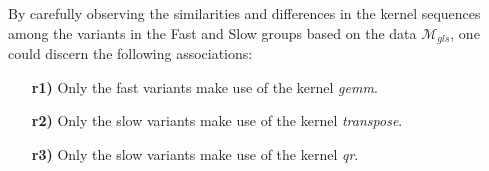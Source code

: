\documentclass[acmsmall,screen, review]{acmart}
\newcommand{\acc}[1]{{\color{red}#1}}
\begin{document}
% 		
By carefully observing the similarities and differences in the kernel sequences among the variants in the Fast and Slow groups based on the data $\mathcal{M}_{gls}$, one could discern the following associations:
\begin{enumerate}
	\itemsep0em 
	\item[\textbf{r1)}] Only the fast variants make use of the kernel \textit{gemm}.
	\item[\textbf{r2)}] Only the slow variants make use of the kernel \textit{transpose}.
	\item[\textbf{r3)}] Only the slow variants make use of the kernel \textit{qr}.
\end{enumerate}
\end{document}
